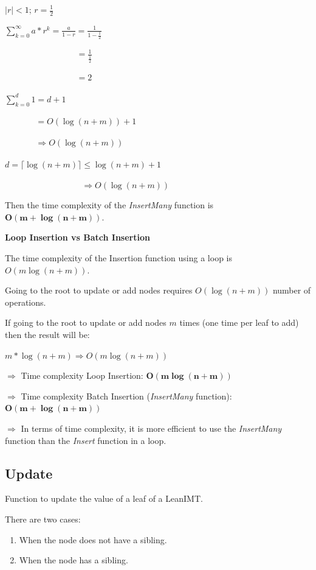 \documentclass{article}
\begin{document}
$|r| < 1$; $r = \frac{1}{2}$

$\sum_{k=0}^{\infty} a * r ^ k = \frac{a}{1-r} = \frac{1}{1-\frac{1}{2}}$

$\phantom{\sum_{k=0}^{\infty} a * r ^ n = \frac{a}{1-r}} = \frac{1}{\frac{1}{2}}$

$\phantom{\sum_{k=0}^{\infty} a * r ^ n = \frac{a}{1-r}} = 2$

$\sum_{k=0}^{d} 1 = d + 1$

$\phantom{\sum_{k=0}^{d} 1} = O(\log (n+m)) + 1$

$\phantom{\sum_{k=0}^{d} 1} \Rightarrow O(\log (n+m))$

$d = \lceil \log (n+m) \rceil \leq \log (n+m) + 1$

$\phantom{d = \lceil \log (n + m) \rceil} \Rightarrow O(\log (n+m))$

Then the time complexity of the \textit{InsertMany} function is $\boldsymbol{O(m + \log (n+m))}$.

\textbf{Loop Insertion vs Batch Insertion}

The time complexity of the Insertion function using a loop is $O(m \log (n+m))$.

Going to the root to update or add nodes requires $ O(\log (n+m))$ number of operations.

If going to the root to update or add nodes $m$ times (one time per leaf to add) then the result will be:

$m * \log (n+m) \Rightarrow \boxed{O(m \log (n+m))}$

$\Rightarrow$ Time complexity Loop Insertion: $\boldsymbol{O(m \log (n+m))}$

$\Rightarrow$ Time complexity Batch Insertion (\textit{InsertMany} function): $\boldsymbol{O(m + \log (n+m))}$

$\Rightarrow$ In terms of time complexity, it is more efficient to use the \textit{InsertMany} function than the \textit{Insert} function in a loop.


\subsection{Update}

Function to update the value of a leaf of a LeanIMT.

There are two cases:

\begin{enumerate}
    \item When the node does not have a sibling.
    \item When the node has a sibling.
\end{enumerate}
\end{document}
